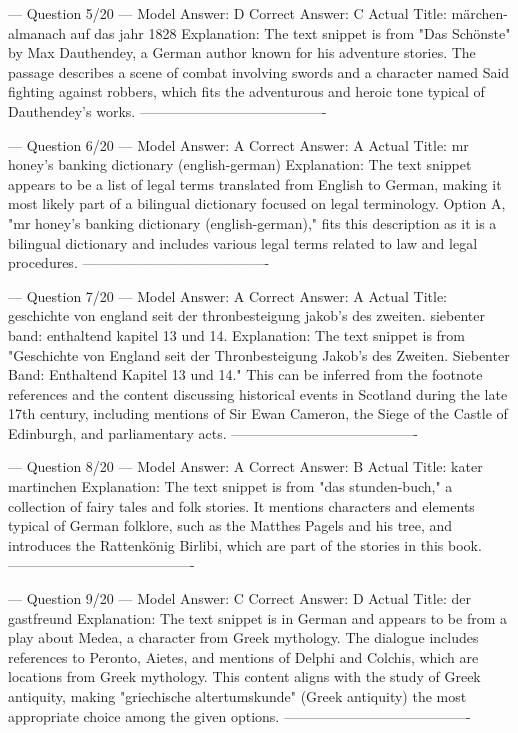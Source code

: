 \documentclass[11pt]{article}
\begin{document}
{--- Question 5/20 ---
Model Answer:    D
Correct Answer:  C
Actual Title:    märchen-almanach auf das jahr 1828
Explanation:     The text snippet is from "Das Schönste" by Max Dauthendey, a German author known for his adventure stories. The passage describes a scene of combat involving swords and a character named Said fighting against robbers, which fits the adventurous and heroic tone typical of Dauthendey's works.
----------------------------------------

--- Question 6/20 ---
Model Answer:    A
Correct Answer:  A
Actual Title:    mr honey's banking dictionary (english-german)
Explanation:     The text snippet appears to be a list of legal terms translated from English to German, making it most likely part of a bilingual dictionary focused on legal terminology. Option A, "mr honey's banking dictionary (english-german)," fits this description as it is a bilingual dictionary and includes various legal terms related to law and legal procedures.
----------------------------------------

--- Question 7/20 ---
Model Answer:    A
Correct Answer:  A
Actual Title:    geschichte von england seit der thronbesteigung jakob's des zweiten. siebenter band: enthaltend kapitel 13 und 14.
Explanation:     The text snippet is from "Geschichte von England seit der Thronbesteigung Jakob's des Zweiten. Siebenter Band: Enthaltend Kapitel 13 und 14." This can be inferred from the footnote references and the content discussing historical events in Scotland during the late 17th century, including mentions of Sir Ewan Cameron, the Siege of the Castle of Edinburgh, and parliamentary acts.
----------------------------------------

--- Question 8/20 ---
Model Answer:    A
Correct Answer:  B
Actual Title:    kater martinchen
Explanation:     The text snippet is from "das stunden-buch," a collection of fairy tales and folk stories. It mentions characters and elements typical of German folklore, such as the Matthes Pagels and his tree, and introduces the Rattenkönig Birlibi, which are part of the stories in this book.
----------------------------------------

--- Question 9/20 ---
Model Answer:    C
Correct Answer:  D
Actual Title:    der gastfreund
Explanation:     The text snippet is in German and appears to be from a play about Medea, a character from Greek mythology. The dialogue includes references to Peronto, Aietes, and mentions of Delphi and Colchis, which are locations from Greek mythology. This content aligns with the study of Greek antiquity, making "griechische altertumskunde" (Greek antiquity) the most appropriate choice among the given options.
----------------------------------------

}
\end{document}
